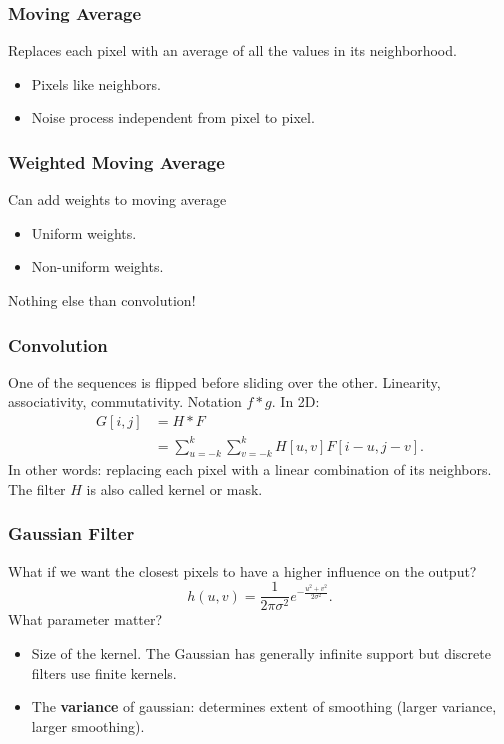 \documentclass[a4paper,12 pt]{article}
\theoremstyle{definition}
\theoremstyle{remark}
\theoremstyle{definition}
\theoremstyle{definition}
\theoremstyle{definition}
\theoremstyle{remark}
\theoremstyle{definition}
\begin{document}
\subsubsection*{Moving Average}
Replaces each pixel with an average of all the values in its neighborhood.
\begin{itemize}
\item Pixels like neighbors.
\item Noise process independent from pixel to pixel.
\end{itemize}
\subsubsection*{Weighted Moving Average}
Can add weights to moving average
\begin{itemize}
\item Uniform weights.
\item Non-uniform weights.
\end{itemize}
Nothing else than convolution!
\subsubsection*{Convolution}
One of the sequences is flipped before sliding over the other. Linearity, associativity, commutativity. Notation $f*g$. In 2D:
\begin{equation}
\begin{split}
G[i,j]&=H*F\\
&=\sum_{u=-k}^k\sum_{v=-k}^{k} H[u,v]F[i-u,j-v].
\end{split}
\end{equation}
In other words: replacing each pixel with a linear combination of its neighbors. The filter $H$ is also called kernel or mask.
\subsubsection*{Gaussian Filter}
What if we want the closest pixels to have a higher influence on the output?
\begin{equation}
h(u,v)=\frac{1}{2\pi \sigma^2}e^{-\frac{u^2+v^2}{2\sigma^2}}.
\end{equation}
What parameter matter? 
\begin{itemize}
\item Size of the kernel. The Gaussian has generally infinite support but discrete filters use finite kernels. 
\item The \textbf{variance} of gaussian: determines extent of smoothing (larger variance, larger smoothing).
\end{itemize}
\end{document}
